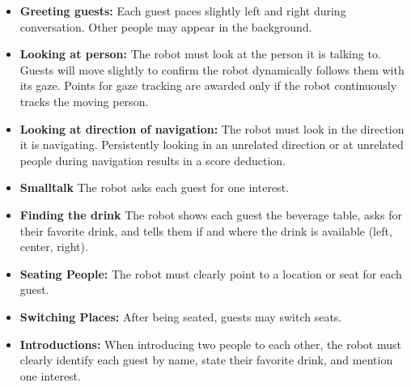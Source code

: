 \begin{itemize}
	\item \textbf{Greeting guests:} Each guest paces slightly left and right during conversation. Other people may appear in the background.
	
	\item \textbf{Looking at person:} The robot must look at the person it is talking to. Guests will move slightly to confirm the robot dynamically follows them with its gaze. Points for gaze tracking are awarded only if the robot continuously tracks the moving person.
	
	\item \textbf{Looking at direction of navigation:} The robot must look in the direction it is navigating. Persistently looking in an unrelated direction or at unrelated people during navigation results in a score deduction.
    
    \item \textbf{Smalltalk} The robot asks each guest for one interest.
    
    \item \textbf{Finding the drink} The robot shows each guest the beverage table, asks for their favorite drink, and tells them if and where the drink is available (left, center, right).
	
	\item \textbf{Seating People:} The robot must clearly point to a location or seat for each guest.

	\item \textbf{Switching Places:} After being seated, guests may switch seats.
	
	\item \textbf{Introductions:} When introducing two people to each other, the robot must clearly identify each guest by name, state their favorite drink, and mention one interest.

\end{itemize}

